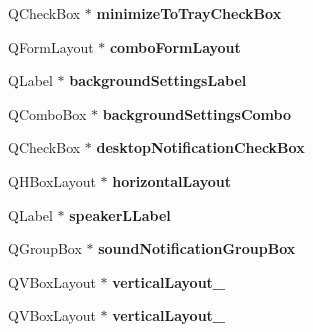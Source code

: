 \begin{DoxyCompactItemize}
\item 
\hypertarget{classUi__Preferences_aa58b4ebc358d2f12989ca10837fa90ea}{
QCheckBox $\ast$ {\bfseries minimizeToTrayCheckBox}}
\label{classUi__Preferences_aa58b4ebc358d2f12989ca10837fa90ea}

\item 
\hypertarget{classUi__Preferences_a5c00b5bc1658f27ec4b4e54a8cd7d934}{
QFormLayout $\ast$ {\bfseries comboFormLayout}}
\label{classUi__Preferences_a5c00b5bc1658f27ec4b4e54a8cd7d934}

\item 
\hypertarget{classUi__Preferences_ab99fc5d0082778ba6c0f80e6fbf14149}{
QLabel $\ast$ {\bfseries backgroundSettingsLabel}}
\label{classUi__Preferences_ab99fc5d0082778ba6c0f80e6fbf14149}

\item 
\hypertarget{classUi__Preferences_a129964e10a8201a42326692ea118d4d5}{
QComboBox $\ast$ {\bfseries backgroundSettingsCombo}}
\label{classUi__Preferences_a129964e10a8201a42326692ea118d4d5}

\item 
\hypertarget{classUi__Preferences_aae955def2c42e4e1c34edf4c65004fe1}{
QCheckBox $\ast$ {\bfseries desktopNotificationCheckBox}}
\label{classUi__Preferences_aae955def2c42e4e1c34edf4c65004fe1}

\item 
\hypertarget{classUi__Preferences_af7c637ac0c6eb90257bbdac6024e3975}{
QHBoxLayout $\ast$ {\bfseries horizontalLayout}}
\label{classUi__Preferences_af7c637ac0c6eb90257bbdac6024e3975}

\item 
\hypertarget{classUi__Preferences_a1178f394ee8cfda62146d337d7f24b43}{
QLabel $\ast$ {\bfseries speakerLLabel}}
\label{classUi__Preferences_a1178f394ee8cfda62146d337d7f24b43}

\item 
\hypertarget{classUi__Preferences_a643214d4acc744082f2ab12e9920c42b}{
QGroupBox $\ast$ {\bfseries soundNotificationGroupBox}}
\label{classUi__Preferences_a643214d4acc744082f2ab12e9920c42b}

\item 
\hypertarget{classUi__Preferences_ada291fec660d38eddb347e9da5253d35}{
QVBoxLayout $\ast$ {\bfseries verticalLayout\_}}
\label{classUi__Preferences_ada291fec660d38eddb347e9da5253d35}

\item 
\hypertarget{classUi__Preferences_aad94bab0c1ff59e70d9504a6a1059b57}{
QVBoxLayout $\ast$ {\bfseries verticalLayout\_}}
\label{classUi__Preferences_aad94bab0c1ff59e70d9504a6a1059b57}


\end{DoxyCompactItemize}
